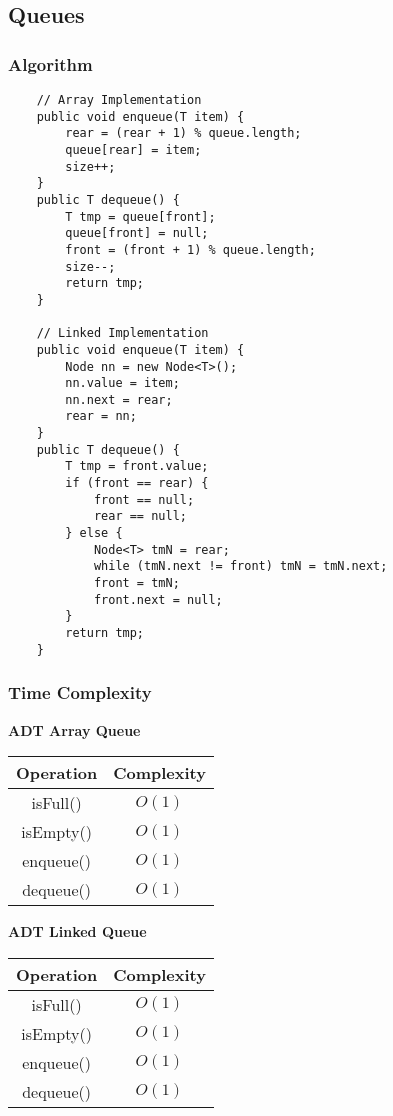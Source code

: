\documentclass[10pt, 
a4paper, 
oneside, 
headinclude, footinclude, 
BCOR5mm]
{scrartcl}
\begin{document}
\subsection{Queues}
\subsubsection{Algorithm}
\begin{lstlisting}
    // Array Implementation
    public void enqueue(T item) {
        rear = (rear + 1) % queue.length;
        queue[rear] = item;
        size++;
    }
    public T dequeue() {
        T tmp = queue[front];
        queue[front] = null;
        front = (front + 1) % queue.length;
        size--;
        return tmp;
    }

    // Linked Implementation
    public void enqueue(T item) {
        Node nn = new Node<T>();
        nn.value = item;
        nn.next = rear;
        rear = nn;
    }
    public T dequeue() {
        T tmp = front.value;
        if (front == rear) {
            front == null;
            rear == null;
        } else {
            Node<T> tmN = rear;
            while (tmN.next != front) tmN = tmN.next;
            front = tmN;
            front.next = null;
        }
        return tmp;
    }
\end{lstlisting}
\subsubsection{Time Complexity}
\textbf{ADT Array Queue}
\begin{center}
    \begin{tabular}{|c|c|}
        \hline
        \textbf{Operation} & \textbf{Complexity} \\
        \hline
        isFull() & $O(1)$ \\
        \hline
        isEmpty() & $O(1)$ \\
        \hline
        enqueue() & $O(1)$ \\
        \hline
        dequeue() & $O(1)$ \\
        \hline
    \end{tabular}
\end{center}
\textbf{ADT Linked Queue}
\begin{center}
    \begin{tabular}{|c|c|}
        \hline
        \textbf{Operation} & \textbf{Complexity} \\
        \hline
        isFull() & $O(1)$ \\
        \hline
        isEmpty() & $O(1)$ \\
        \hline
        enqueue() & $O(1)$ \\
        \hline
        dequeue() & $O(1)$ \\
        \hline
    \end{tabular}
\end{center}
\newpage
\end{document}

